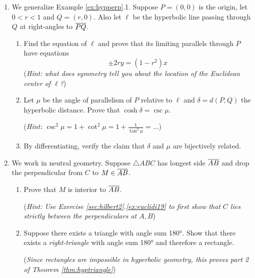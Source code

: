 \begin{exercises}
\begin{enumerate}
	    
		\item\label{exs:angparallelism} 
		We generalize Example \ref{ex:hypperp}.1. Suppose $P=(0,0)$ is the origin, let $0<r<1$ and $Q=(r,0)$. Also let $\ell$ be the hyperbolic line passing through $Q$ at right-angles to $\overline{PQ}$.
	  \begin{enumerate}
	    \item Find the equation of $\ell$ and prove that its limiting parallels through $P$ have equations
	    \[
	    	\pm 2ry=(1-r^2)x
	    \]
	    (\emph{Hint: what does symmetry tell you about the location of the Euclidean center of $\ell$?})
	    \item Let $\mu$ be the angle of parallelism of $P$ relative to $\ell$ and $\delta=d(P,Q)$ the hyperbolic distance. Prove that $\cosh\delta=\csc\mu$.\par
	    (\emph{Hint: $\csc^2\!\mu=1+\cot^2\!\mu=1+\frac 1{\tan^2\!\mu}=\ldots$})
	    \item By differentiating, verify the claim that $\delta$ and $\mu$ are bijectively related.
	  \end{enumerate}
	  
	  \item\label{exs:triless180} We work in neutral geometry. Suppose $\triangle ABC$ has longest side $\overline{AB}$ and drop the perpendicular from $C$ to $M\in\overline{AB}$.
	  \begin{enumerate}
	    \item Prove that $M$ is interior to $\overline{AB}$.\par
	    (\emph{Hint: Use Exercise \ref*{sec:hilbert2}.\ref{ex:euclidi19} to first show that $C$ lies strictly between the perpendiculars at $A,B$})
	    \item Suppose there exists a triangle with angle sum \ang{180}. Show that there exists a \emph{right-triangle} with angle sum \ang{180} and therefore a rectangle.\par
	  	(\emph{Since rectangles are impossible in hyperbolic geometry, this proves part 2 of Theorem \ref{thm:hyptriangle}})
	 	\end{enumerate}
	  

\end{enumerate}
\end{exercises}
